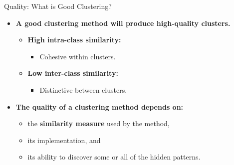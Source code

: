 \begin{frame}{Quality: What is Good Clustering?}
	\begin{itemize}
		\item \textbf{A good clustering method will produce high-quality
			      clusters.}
		      \begin{itemize}
			      \item \textbf{\color{airforceblue}High intra-class similarity:}
			            \begin{itemize}
				            \item Cohesive within clusters.
			            \end{itemize}
			      \item \textbf{\color{airforceblue}Low inter-class similarity:}
			            \begin{itemize}
				            \item Distinctive between clusters.
			            \end{itemize}
		      \end{itemize}
		\item \textbf{The {\color{airforceblue}quality} of a clustering method
			      depends on:}
		      \begin{itemize}
			      \item the \textbf{\color{airforceblue}similarity measure} used by
			            the method,
			      \item its implementation, and
			      \item its ability to discover some or all of the hidden patterns.
		      \end{itemize}
	\end{itemize}
\end{frame}

